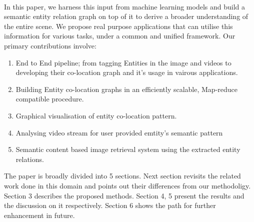 \documentclass[conference]{IEEEtran}
\begin{document}
\\In this paper, we harness this input from machine learning models and build a semantic entity relation graph on top of it to derive a broader understanding of the entire scene. We propose real purpose applications that can  utilise this information for various tasks, under a common and unified framework. Our primary contributions involve:
    \begin{enumerate}
        \item End to End pipeline; from tagging Entities in the image and videos to developing their co-location graph and it's usage in vairous applications.
        \item Building Entity co-location graphs in an efficiently scalable, Map-reduce compatible procedure.
        \item Graphical visualisation of entity co-location pattern.
        \item Analysing video stream for user provided emtity's semantic pattern
        \item Semantic content based image retrieval system using the extracted entity relations.
    \end{enumerate}

The paper is broadly divided into 5 sections. Next section revisits the related work done in this domain and points out their differences from our methodoligy. Section 3 describes the proposed methods. Section 4, 5 present the results and the discussion on it respectively. Section 6 shows the path for further enhancement in future.
\end{document}
